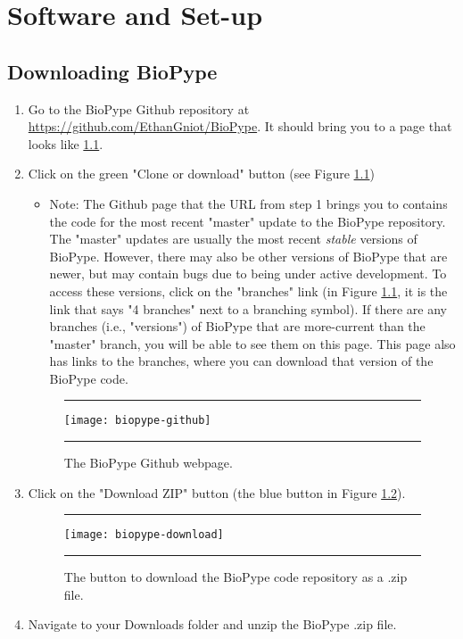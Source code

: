\chapter{Software and Set-up}
\label{chap:software}
\section{Downloading BioPype}
%
\begin{enumerate}
\item Go to the BioPype Github repository at \url{https://github.com/EthanGniot/BioPype}. It should bring you to a page that looks like \ref{fig:biopype-github}.

\item Click on the green "Clone or download" button (see Figure \ref{fig:biopype-github})
    \begin{itemize}
    \item \small Note: The Github page that the URL from step 1 brings you to contains the code for the most recent "master" update to the BioPype repository. The "master" updates are usually the most recent \textit{stable} versions of BioPype. However, there may also be other versions of BioPype that are newer, but may contain bugs due to being under active development. To access these versions, click on the "branches" link (in Figure \ref{fig:biopype-github}, it is the link that says "4 branches" next to a branching symbol). If there are any branches (i.e., "versions") of BioPype that are more-current than the "master" branch, you will be able to see them on this page. This page also has links to the branches, where you can download that version of the BioPype code.
    \end{itemize}
%
    \begin{figure}[hbtp]
        \begin{maxipage}
        \hrule
        \centering
        \texttt{[image: biopype-github]}
        \caption{The BioPype Github webpage.}
        \label{fig:biopype-github}
        \hrule
        \end{maxipage}
    \end{figure}


\item Click on the "Download ZIP" button (the blue button in Figure \ref{fig:biopype-download}).
    \begin{figure}[hbtp]
        \begin{maxipage}
        \hrule
        \centering
        \texttt{[image: biopype-download]}
        \caption{The button to download the BioPype code repository as a .zip file.}
        \label{fig:biopype-download}
        \hrule
        \end{maxipage}
    \end{figure}
    

\item Navigate to your Downloads folder and unzip the BioPype .zip file. 
    
\end{enumerate}

